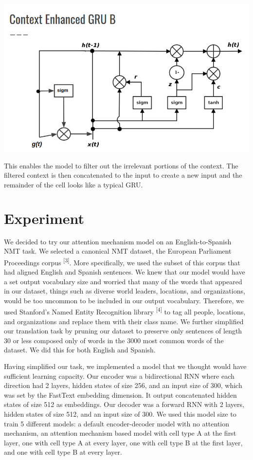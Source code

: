 \documentclass[letterpaper, 11pt]{article}
\begin{document}
\begin{multicols}{2}
\begin{center}
\includegraphics[scale=.2]{context-gru-b}
\end{center}

This enables the model to filter out the irrelevant portions of the context.
The filtered context is then concatenated to the input to create a new input and the remainder of
the cell looks like a typical GRU.

\section{Experiment}

We decided to try our attention mechanism model on an English-to-Spanish NMT task.
We selected a canonical NMT dataset, the European Parliament Proceedings corpus
\textsuperscript{[3]}.
More specifically, we used the subset of this corpus that had aligned English and Spanish sentences.
We knew that our model would have a set output vocabulary size and worried that many of the words
that appeared in our dataset, things such as diverse world leaders, locations, and organizations,
would be too uncommon to be included in our output vocabulary.
Therefore, we used Stanford’s Named Entity Recognition library \textsuperscript{[4]}
to tag all people, locations, and organizations and replace them with their class name.
We further simplified our translation task by pruning our dataset to preserve only sentences of
length 30 or less composed only of words in the 3000 most common words of the dataset.
We did this for both English and Spanish.

Having simplified our task, we implemented a model that we thought would have sufficient learning
capacity.
Our encoder was a bidirectional RNN where each direction had 2 layers, hidden states of size 256,
and an input size of 300, which was set by the FastText embedding dimension.
It output concatenated hidden states of size 512 as embeddings.
Our decoder was a forward RNN with 2 layers, hidden states of size 512, and an input size of 300.
We used this model size to train 5 different models: a default encoder-decoder model with no
attention mechanism, an attention mechanism based model with cell type A at the first
layer, one with cell type A at every layer, one with cell type B at the first
layer, and one with cell type B at every layer.


\end{multicols}
\end{document}

